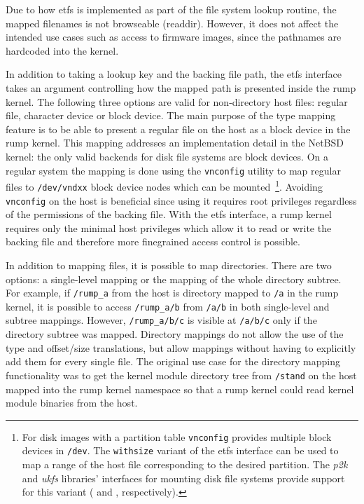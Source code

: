 Due to how etfs is implemented as part of the file system lookup routine,
the mapped filenames is not browseable (\ie readdir).  However, it does
not affect the intended use cases such as access to firmware images,
since the pathnames are hardcoded into the kernel.

In addition to taking a lookup key and the backing file path, the
etfs interface takes an argument controlling how the mapped path
is presented inside the rump kernel.  The following three options
are valid for non-directory host files: regular file, character
device or block device.
The main purpose of the type mapping feature is to be able
to present a regular file on the host as a block device in the rump
kernel.  This mapping addresses an implementation detail in the NetBSD
kernel: the only valid backends for disk file systems are block
devices.  On a regular system the mapping is done using the
\texttt{vnconfig} utility to map regular files to \texttt{/dev/vndxx}
block device nodes which can be mounted~\footnote
{
	For disk images with a partition table \texttt{vnconfig}
	provides multiple block devices in \texttt{/dev}.  The
	\texttt{withsize} variant of the etfs interface can be used
	to map a range of the host file corresponding to the desired
	partition.  The \textit{p2k} and \textit{ukfs} libraries'
	interfaces for mounting disk file systems provide support
	for this variant ( and
	, respectively).
}.
Avoiding \texttt{vnconfig} on the host is beneficial since using
it requires root privileges regardless of the permissions of the
backing file.  With the etfs interface, a rump kernel requires only
the minimal host privileges which allow it to read or write the
backing file and therefore more finegrained access control is
possible.

In addition to mapping files, it is possible to map directories.
There are two options: a single-level mapping or the mapping of
the whole directory subtree.  For example, if \verb+/rump_a+ from
the host is directory mapped to \verb+/a+ in the rump kernel, it
is possible to access \verb+/rump_a/b+ from \verb+/a/b+ in both
single-level and subtree mappings.  However, \verb+/rump_a/b/c+ is
visible at \verb+/a/b/c+ only if the directory subtree was mapped.
Directory mappings do not allow the use of the type and offset/size
translations, but allow mappings without having to explicitly add
them for every single file.
The original use case for the directory mapping functionality was
to get the kernel module directory tree from \texttt{/stand} on
the host mapped into the rump kernel namespace so that a rump kernel
could read kernel module binaries from the host.


